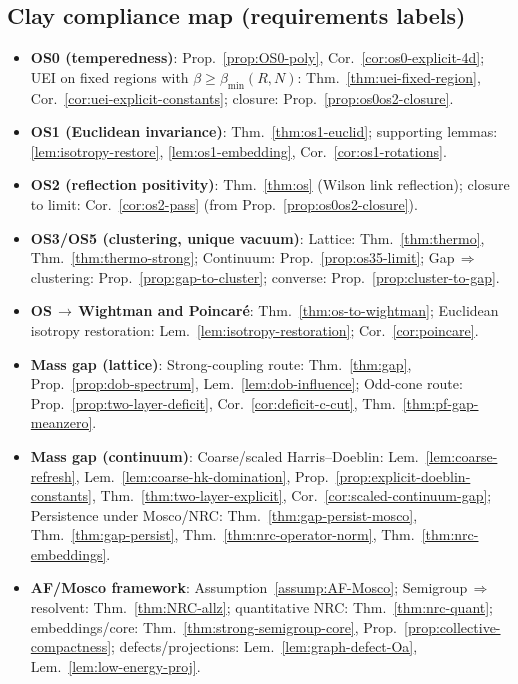 \documentclass[11pt]{amsart}
\theoremstyle{plain}
\theoremstyle{definition}
\theoremstyle{remark}
\begin{document}
\subsection*{Clay compliance map (requirements \textrightarrow{} labels)}
\begin{itemize}
  \item \textbf{OS0 (temperedness)}: Prop.~\ref{prop:OS0-poly}, Cor.~\ref{cor:os0-explicit-4d}; UEI on fixed regions with $\beta\ge \beta_{\min}(R,N)$: Thm.~\ref{thm:uei-fixed-region}, Cor.~\ref{cor:uei-explicit-constants}; closure: Prop.~\ref{prop:os0os2-closure}.
  \item \textbf{OS1 (Euclidean invariance)}: Thm.~\ref{thm:os1-euclid}; supporting lemmas: \ref{lem:isotropy-restore}, \ref{lem:os1-embedding}, Cor.~\ref{cor:os1-rotations}.
  \item \textbf{OS2 (reflection positivity)}: Thm.~\ref{thm:os} (Wilson link reflection); closure to limit: Cor.~\ref{cor:os2-pass} (from Prop.~\ref{prop:os0os2-closure}).
  \item \textbf{OS3/OS5 (clustering, unique vacuum)}: Lattice: Thm.~\ref{thm:thermo}, Thm.~\ref{thm:thermo-strong}; Continuum: Prop.~\ref{prop:os35-limit}; Gap\,$\Rightarrow$\,clustering: Prop.~\ref{prop:gap-to-cluster}; converse: Prop.~\ref{prop:cluster-to-gap}.
  \item \textbf{OS\,$\to$\,Wightman and Poincar\'e}: Thm.~\ref{thm:os-to-wightman}; Euclidean isotropy restoration: Lem.~\ref{lem:isotropy-restoration}; Cor.~\ref{cor:poincare}.
  \item \textbf{Mass gap (lattice)}: Strong-coupling route: Thm.~\ref{thm:gap}, Prop.~\ref{prop:dob-spectrum}, Lem.~\ref{lem:dob-influence}; Odd-cone route: Prop.~\ref{prop:two-layer-deficit}, Cor.~\ref{cor:deficit-c-cut}, Thm.~\ref{thm:pf-gap-meanzero}.
  \item \textbf{Mass gap (continuum)}: Coarse/scaled Harris--Doeblin: Lem.~\ref{lem:coarse-refresh}, Lem.~\ref{lem:coarse-hk-domination}, Prop.~\ref{prop:explicit-doeblin-constants}, Thm.~\ref{thm:two-layer-explicit}, Cor.~\ref{cor:scaled-continuum-gap}; Persistence under Mosco/NRC: Thm.~\ref{thm:gap-persist-mosco}, Thm.~\ref{thm:gap-persist}, Thm.~\ref{thm:nrc-operator-norm}, Thm.~\ref{thm:nrc-embeddings}.
  \item \textbf{AF/Mosco framework}: Assumption~\ref{assump:AF-Mosco}; Semigroup\,$\Rightarrow$\,resolvent: Thm.~\ref{thm:NRC-allz}; quantitative NRC: Thm.~\ref{thm:nrc-quant}; embeddings/core: Thm.~\ref{thm:strong-semigroup-core}, Prop.~\ref{prop:collective-compactness}; defects/projections: Lem.~\ref{lem:graph-defect-Oa}, Lem.~\ref{lem:low-energy-proj}.

\end{itemize}
\end{document}
